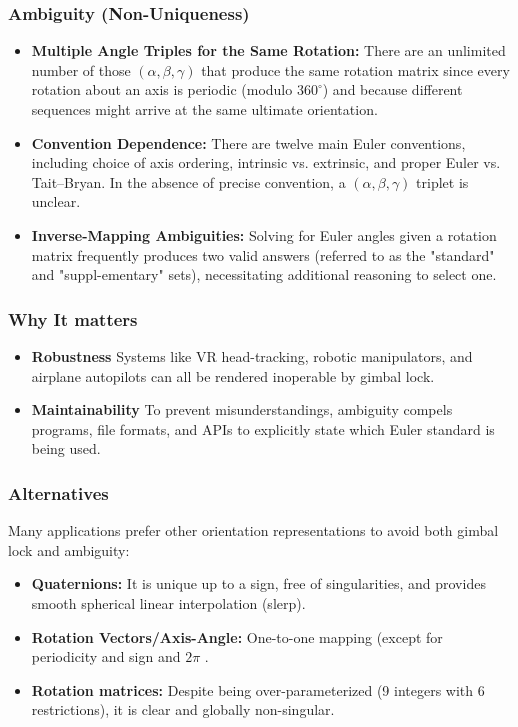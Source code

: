 \documentclass[12pt]{article}
\begin{document}
\subsubsection{Ambiguity (Non-Uniqueness)}
\begin{itemize}
  \item \textbf{Multiple Angle Triples for the Same Rotation:} 
   There are an unlimited number of those \((\alpha,\beta,\gamma)\) that produce the same rotation matrix since every rotation about an axis is periodic (modulo \(360^\circ\)) and because different sequences might arrive at the same ultimate orientation\cite{ref20}.
  \item \textbf{Convention Dependence:} 
    There are twelve main Euler conventions, including choice of axis ordering, intrinsic vs. extrinsic, and proper Euler vs. Tait–Bryan.  In the absence of precise convention, a \((\alpha,\beta,\gamma)\) triplet is unclear\cite{ref20}.
  \item \textbf{Inverse-Mapping Ambiguities:} 
   Solving for Euler angles given a rotation matrix frequently produces two valid answers (referred to as the "standard" and "suppl-ementary" sets), necessitating additional reasoning to select one\cite{ref20}.
\end{itemize}

\subsubsection*{Why It matters}
\begin{itemize}
  \item \textbf{Robustness} Systems like VR head-tracking, robotic manipulators, and airplane autopilots can all be rendered inoperable by gimbal lock\cite{ref20}.
  \item \textbf{Maintainability} To prevent misunderstandings, ambiguity compels programs, file formats, and APIs to explicitly state which Euler standard is being used\cite{ref20}.
\end{itemize}

\subsubsection*{Alternatives}
Many applications prefer other orientation representations to avoid both gimbal lock and ambiguity:
\begin{itemize}
  \item \textbf{Quaternions:}  It is unique up to a sign, free of singularities, and provides smooth spherical linear interpolation (slerp)\cite{ref20}. 
  \item \textbf{Rotation Vectors/Axis-Angle:}  One-to-one mapping (except for periodicity and sign and \(2\pi\) \cite{ref20}. 
  \item \textbf{Rotation matrices:}  Despite being over-parameterized (9 integers with 6 restrictions), it is clear and globally non-singular\cite{ref20}. 
\end{itemize}
\end{document}
